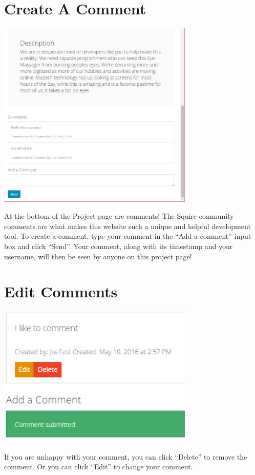 \documentclass[11pt]{report}
\begin{document}
\section{Create A Comment}
	\begin{center}
           \includegraphics[width=0.7\textwidth]{projectpage_bottom.png}
    \end{center}
At the bottom of the Project page are comments! The Squire community comments are what makes this website such a unique and helpful development tool. To create a comment, type your comment in the “Add a comment” input box and click “Send”. Your comment, along with its timestamp and your username, will then be seen by anyone on this project page! 

\section{Edit Comments}
	\begin{center}
           \includegraphics[width=0.7\textwidth]{comment.png}
    \end{center}
If you are unhappy with your comment, you can click “Delete” to remove the comment. Or you can click “Edit” to change your comment. 
\end{document}
